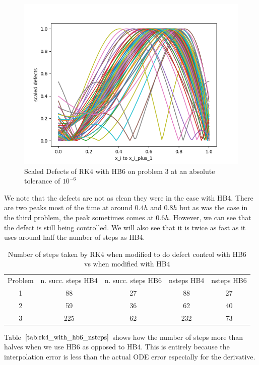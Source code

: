 \documentclass{article}
\begin{document}
\begin{figure}[H]
\centering
\includegraphics[width=0.7\linewidth]{./figures/rk4_with_hb6_p3_scaled_defects}
\caption{Scaled Defects of RK4 with HB6 on problem 3 at an absolute tolerance of $10^{-6}$}
\label{fig:rk4_with_hb6_p3_scaled_defects}
\end{figure}

We note that the defects are not as clean they were in the case with HB4. There are two peaks most of the time at around $0.4h$ and $0.8h$ but as was the case in the third problem, the peak sometimes comes at $0.6h$. However, we can see that the defect is still being controlled. We will also see that it is twice as fast as it uses around half the number of steps as HB4.

\begin{table}[h]
\caption {Number of steps taken by RK4 when modified to do defect control with HB6 vs when modified with HB4} \label{tab:rk4_with_hb6_nsteps}
\begin{center}
\begin{tabular}{ c c c c c } 
Problem & n. succ. steps HB4 & n. succ. steps HB6 & nsteps HB4  & nsteps HB6 \\ 
1       & 88                 &        27          & 88         & 27 \\ 
2       & 59                 &        36          & 62         & 40 \\
3       & 225                &        62          & 232        & 73 \\
\end{tabular}
\end{center}
\end{table}

Table $\ref{tab:rk4_with_hb6_nsteps}$ shows how the number of steps more than halves when we use HB6 as opposed to HB4. This is entirely because the interpolation error is less than the actual ODE error especially for the derivative.
\end{document}
